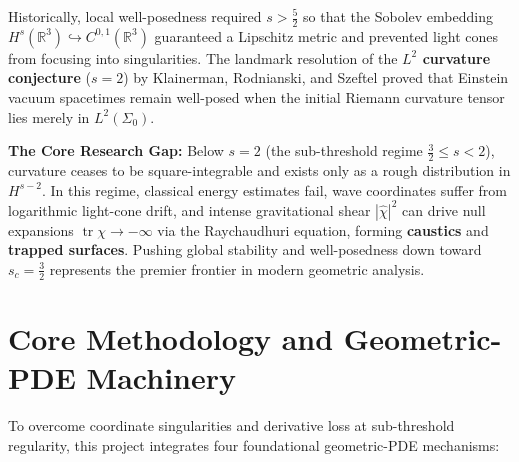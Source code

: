 \documentclass[11pt, a4paper]{article}
\begin{document}
Historically, local well-posedness required $s > \frac{5}{2}$ so that the Sobolev embedding $H^s(\mathbb{R}^3) \hookrightarrow C^{0,1}(\mathbb{R}^3)$ guaranteed a Lipschitz metric and prevented light cones from focusing into singularities. The landmark resolution of the \textbf{$L^2$ curvature conjecture} ($s = 2$) by Klainerman, Rodnianski, and Szeftel proved that Einstein vacuum spacetimes remain well-posed when the initial Riemann curvature tensor lies merely in $L^2(\Sigma_0)$.

\vspace{0.4em}
\noindent \textbf{The Core Research Gap:} Below $s = 2$ (the sub-threshold regime $\frac{3}{2} \le s < 2$), curvature ceases to be square-integrable and exists only as a rough distribution in $H^{s-2}$. In this regime, classical energy estimates fail, wave coordinates suffer from logarithmic light-cone drift, and intense gravitational shear $|\hat{\chi}|^2$ can drive null expansions $\operatorname{tr}\chi \to -\infty$ via the Raychaudhuri equation, forming \textbf{caustics} and \textbf{trapped surfaces}. Pushing global stability and well-posedness down toward $s_c = \frac{3}{2}$ represents the premier frontier in modern geometric analysis.

\section{Core Methodology and Geometric-PDE Machinery}

To overcome coordinate singularities and derivative loss at sub-threshold regularity, this project integrates four foundational geometric-PDE mechanisms:
\end{document}
